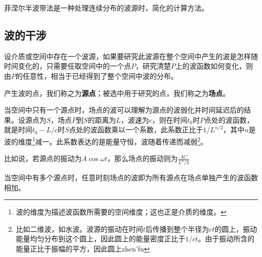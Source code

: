 



菲涅尔半波带法是一种处理连续分布的波源时，简化的计算方法。



\subsection{波的干涉}


设介质或空间中存在一个波源，如果要研究此波源在整个空间中产生的波是怎样随时间变化的，只需要任取空间中的一个点$P$，研究清楚$P$上的波函数如何变化，则由$P$的任意性，相当于已经得到了整个空间中波的分布。

产生波的点，我们称之为\textbf{源点}；被选中用于研究的点，我们称之为\textbf{场点}。

当空间中只有一个源点时，场点的波可以理解为源点的波弱化并时间延迟后的结果。设源点为$S$，场点$P$到$S$的距离为$L$，波速为$c$，则在时间$t_0$时$P$点处的波函数，就是时间$t_0-L/c$时$S$点处的波函数乘以一个系数，此系数正比于$1/L^{n/2}$，其中$n$是波的维度\footnote{波的维度为描述波函数所需要的空间维度；这也正是介质的维度。}减一。此系数表达的是能量守恒，波随着传递而减弱\footnote{比如二维波，如水波。波源的振动在时间$t$后传播到整个半径为$ct$的圆上，振动能量均匀分布到这个圆上，因此圆上的能量密度正比于$1/ct$。由于振动所含的能量正比于振幅的平方，因此圆上zhen'fu}。

比如说，若源点的振动为$A\cos \omega t$，那么场点的振动则为$\frac{AC}{L^n/2}$

当空间中有多个源点时，任意时刻场点的波即为所有源点在场点单独产生的波函数相加。
























